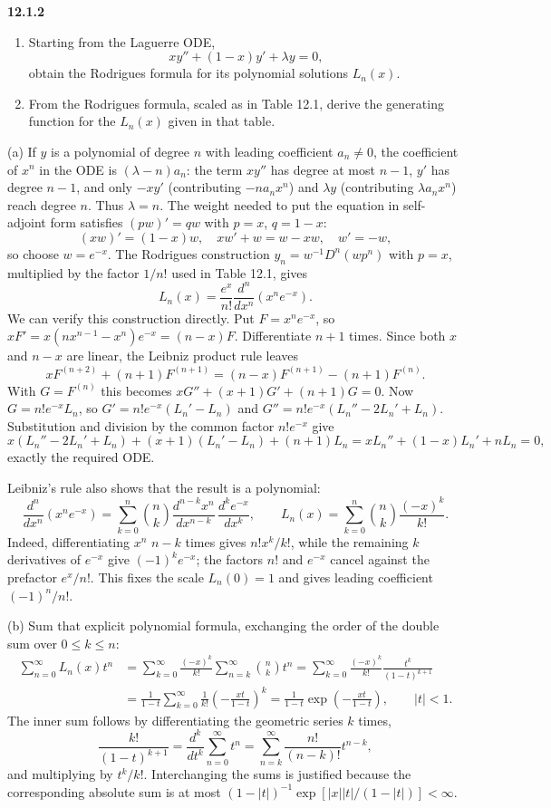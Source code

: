 \par\bigskip
\noindent\textbf{12.1.2}\quad
\begin{enumerate}
\item[(a)] Starting from the Laguerre ODE,
  \[
  xy''+(1-x)y'+\lambda y=0,
  \]
  obtain the Rodrigues formula for its polynomial solutions $L_{n}(x)$.
\item[(b)] From the Rodrigues formula, scaled as in Table 12.1, derive the
  generating function for the $L_{n}(x)$ given in that table.
\end{enumerate}
\solution
(a) If $y$ is a polynomial of degree $n$ with leading coefficient $a_n\ne0$,
the coefficient of $x^n$ in the ODE is $(\lambda-n)a_n$: the term $xy''$
has degree at most $n-1$, $y'$ has degree $n-1$, and only $-xy'$
(contributing $-na_nx^n$) and $\lambda y$ (contributing $\lambda a_nx^n$)
reach degree $n$. Thus
$\lambda=n$. The weight needed to put the equation in self-adjoint form
satisfies $(pw)'=qw$ with $p=x$, $q=1-x$:
\[
(xw)'=(1-x)w,\quad xw'+w=w-xw,\quad w'=-w,
\]
so choose $w=e^{-x}$. The Rodrigues construction
$y_n=w^{-1}D^n(wp^n)$ with $p=x$, multiplied by the factor $1/n!$ used in
Table 12.1, gives
\[
\boxed{L_n(x)=\frac{e^x}{n!}\frac{d^n}{dx^n}(x^ne^{-x})}.
\]
We can verify this construction directly. Put $F=x^ne^{-x}$, so
$xF'=x(nx^{n-1}-x^n)e^{-x}=(n-x)F$. Differentiate $n+1$ times. Since
both $x$ and $n-x$ are linear, the Leibniz product rule leaves
\[
xF^{(n+2)}+(n+1)F^{(n+1)}
=(n-x)F^{(n+1)}-(n+1)F^{(n)}.
\]
With $G=F^{(n)}$ this becomes $xG''+(x+1)G'+(n+1)G=0$.
Now $G=n!e^{-x}L_n$, so
$G'=n!e^{-x}(L_n'-L_n)$ and
$G''=n!e^{-x}(L_n''-2L_n'+L_n)$.
Substitution and division by the common factor $n!e^{-x}$ give
\[
x(L_n''-2L_n'+L_n)+(x+1)(L_n'-L_n)+(n+1)L_n
=xL_n''+(1-x)L_n'+nL_n=0,
\]
exactly the required ODE.

Leibniz's rule also shows that the result is a polynomial:
\[
\frac{d^n}{dx^n}(x^ne^{-x})
=\sum_{k=0}^n\binom nk\frac{d^{n-k}x^n}{dx^{n-k}}\,
 \frac{d^ke^{-x}}{dx^k},
\qquad
L_n(x)=\sum_{k=0}^n\binom nk\frac{(-x)^k}{k!}.
\]
Indeed, differentiating $x^n$ $n-k$ times gives $n!x^k/k!$, while the
remaining $k$ derivatives of $e^{-x}$ give $(-1)^ke^{-x}$; the factors
$n!$ and $e^{-x}$ cancel against the prefactor $e^x/n!$.
This fixes the scale $L_n(0)=1$ and gives leading coefficient $(-1)^n/n!$.

(b) Sum that explicit polynomial formula, exchanging the order of the
double sum over $0\le k\le n$:
\begin{align*}
\sum_{n=0}^{\infty}L_n(x)t^n
&=\sum_{k=0}^{\infty}\frac{(-x)^k}{k!}
       \sum_{n=k}^{\infty}\binom nk t^n
 =\sum_{k=0}^{\infty}\frac{(-x)^k}{k!}
       \frac{t^k}{(1-t)^{k+1}}\\
&=\frac1{1-t}\sum_{k=0}^{\infty}\frac1{k!}
       \left(-\frac{xt}{1-t}\right)^k
 =\boxed{\frac1{1-t}\exp\left(-\frac{xt}{1-t}\right)},\qquad |t|<1.
\end{align*}
The inner sum follows by differentiating the geometric series
$k$ times,
\[
\frac{k!}{(1-t)^{k+1}}=\frac{d^k}{dt^k}\sum_{n=0}^{\infty}t^n
=\sum_{n=k}^{\infty}\frac{n!}{(n-k)!}t^{n-k},
\]
and multiplying by $t^k/k!$. Interchanging the sums is justified because the
corresponding absolute sum is at most
$(1-|t|)^{-1}\exp[|x||t|/(1-|t|)]<\infty$.

